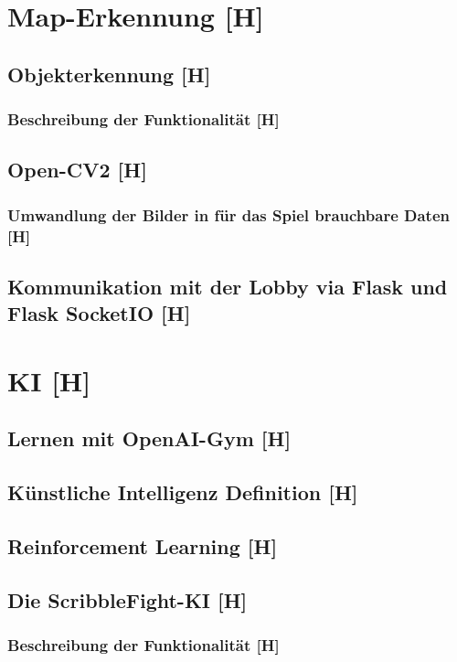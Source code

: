 

\section{Map-Erkennung [H]}
\subsection{Objekterkennung [H]}
\subsubsection{Beschreibung der Funktionalität [H]}
\subsection{Open-CV2 [H]}
\subsubsection{Umwandlung der Bilder in für das Spiel brauchbare Daten [H]}
\subsection{Kommunikation mit der Lobby via Flask und Flask SocketIO [H]}

\section{KI [H]}
\subsection{Lernen mit OpenAI-Gym [H]}
\subsection{Künstliche Intelligenz Definition [H]}
\subsection{Reinforcement Learning [H]}
\subsection{Die ScribbleFight-KI [H]}
\subsubsection{Beschreibung der Funktionalität [H]}
